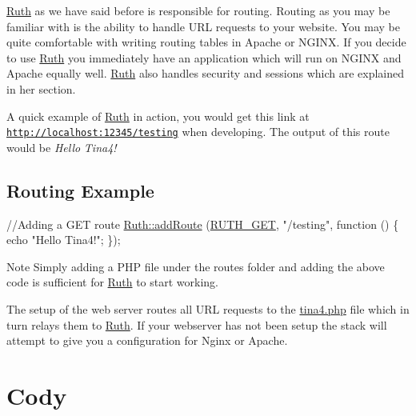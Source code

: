 \hyperlink{classRuth}{Ruth} as we have said before is responsible for routing. Routing as you may be familiar with is the ability to handle U\+R\+L requests to your website. You may be quite comfortable with writing routing tables in Apache or N\+G\+I\+N\+X. If you decide to use \hyperlink{classRuth}{Ruth} you immediately have an application which will run on N\+G\+I\+N\+X and Apache equally well. \hyperlink{classRuth}{Ruth} also handles security and sessions which are explained in her section.

A quick example of \hyperlink{classRuth}{Ruth} in action, you would get this link at \href{http://localhost:12345/testing}{\tt http\+://localhost\+:12345/testing} when developing. The output of this route would be {\itshape Hello} {\itshape Tina4!} \hypertarget{index_ruth_example}{}\subsection{Routing Example}\label{index_ruth_example}

\begin{DoxyCode}
\textcolor{comment}{//Adding a GET route}
\hyperlink{classRuth_ad13bc87f60f8b74efd4c784fa2c49288}{Ruth::addRoute} (\hyperlink{Ruth_8php_acc73cd34b6fcffd15a4fdd050e0a86d8}{RUTH\_GET}, \textcolor{stringliteral}{"/testing"}, \textcolor{keyword}{function} () \{
     echo \textcolor{stringliteral}{"Hello Tina4!"};
\});
\end{DoxyCode}


\begin{DoxyNote}{Note}
Simply adding a P\+H\+P file under the routes folder and adding the above code is sufficient for \hyperlink{classRuth}{Ruth} to start working.

The setup of the web server routes all U\+R\+L requests to the \hyperlink{tina4_8php}{tina4.\+php} file which in turn relays them to \hyperlink{classRuth}{Ruth}. If your webserver has not been setup the stack will attempt to give you a configuration for Nginx or Apache.
\end{DoxyNote}
\hypertarget{index_cody}{}\section{Cody}\label{index_cody}


